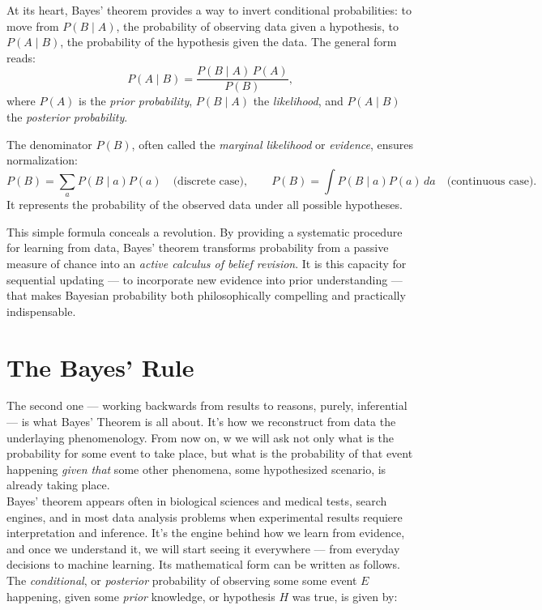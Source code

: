\documentclass{book}
\begin{document}
At its heart, Bayes’ theorem provides a way to invert conditional probabilities: to move from $P(B \mid A)$, the probability of observing data given a hypothesis, to $P(A \mid B)$, the probability of the hypothesis given the data. The general form reads:
\[
P(A \mid B) = \frac{P(B \mid A) \, P(A)}{P(B)} ,
\]
where $P(A)$ is the \textit{prior probability}, $P(B \mid A)$ the \textit{likelihood}, and $P(A \mid B)$ the \textit{posterior probability}.

The denominator $P(B)$, often called the \textit{marginal likelihood} or \textit{evidence}, ensures normalization:
\[
P(B) = \sum_{a} P(B \mid a) P(a) \quad \text{(discrete case)}, \qquad  
P(B) = \int P(B \mid a) P(a) \, da \quad \text{(continuous case)} .
\]
It represents the probability of the observed data under all possible hypotheses.

This simple formula conceals a revolution. By providing a systematic procedure for learning from data, Bayes’ theorem transforms probability from a passive measure of chance into an \textit{active calculus of belief revision}. It is this capacity for sequential updating --- to incorporate new evidence into prior understanding --- that makes Bayesian probability both philosophically compelling and practically indispensable.

\section{The Bayes' Rule}

The second one — working backwards from results to reasons, purely, inferential — is what Bayes’ Theorem is all about. It’s how we reconstruct from data the underlaying phenomenology. From now on, w we will ask not only what is the probability for some event to take place, but what is the probability of that event happening \textit{given that} some other phenomena, some hypothesized scenario, is already taking place.\\

Bayes’ theorem appears often in biological sciences and medical tests, search engines, and in most data analysis problems when experimental results requiere interpretation and inference. It’s the engine behind how we learn from evidence, and once we understand it, we will start seeing it everywhere — from everyday decisions to machine learning. Its mathematical form can be written as follows. The \textit{conditional}, or \textit{posterior} probability of observing some some event $E$ happening, given some \textit{prior} knowledge, or hypothesis $H$ was true, is given by:
\end{document}
